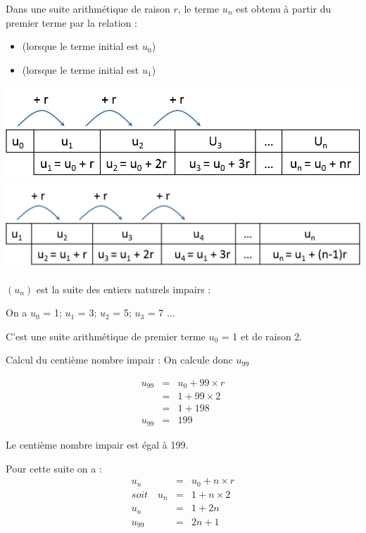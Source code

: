 \documentclass[12pt,a4paper]{article}
\begin{document}
\begin{mybilan}
	Dans une suite arithmétique de raison $r$, le terme $u_n$ est obtenu à partir du premier terme par la relation :
	\begin{itemize}
		\item {} (lorsque le terme initial est $u_0$) 
		\item {} (lorsque le terme initial est $u_1$)
	\end{itemize}
	
	\begin{multicols}{2}
		\includegraphics[scale=0.4]{./img/arith1}
		\includegraphics[scale=0.4]{./img/arith2}
	\end{multicols}
\end{mybilan}


\begin{myex}
	$(u_n)$ est la suite des entiers naturels impairs :
	
	On a $u_0$ = 1; $u_1$ = 3; $u_2$ = 5; $u_3$ = 7 ...
	
	C'est une suite arithmétique de premier terme $u_0$ = 1 et de raison 2.
	
	Calcul du centième nombre impair :
	 On calcule donc $u_{99}$
	 
	 \begin{eqnarray*}
	 	u_{99} & = & u_0 + 99 \times r \\
				& = & 1 + 99 \times 2 \\
				& = & 1 + 198 \\
		u_{99}	& = & 199	 	
	 \end{eqnarray*}
 
 Le centième nombre impair est égal à 199.
 
 
 Pour cette suite on a :
	 \begin{eqnarray*}
	 	 u_{n} & = & u_0 + n \times r \\
		soit \quad u_n & = & 1 + n \times 2 \\
	 	 u_n & = & 1 + 2n \\
	 	 u_{99}	& = & 2n + 1	 	
	 \end{eqnarray*}
 
\end{myex}
\end{document}
